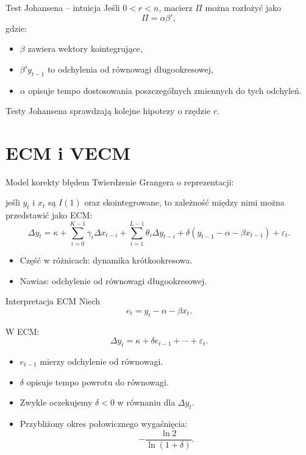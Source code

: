 \documentclass[11pt,aspectratio=169,xcolor=dvipsnames]{beamer}
\begin{document}
\begin{frame}{Test Johansena -- intuicja}
  Jeśli $0<r<n$, macierz $\Pi$ można rozłożyć jako
  \[
    \Pi = \alpha\beta',
  \]
  gdzie:
  \begin{itemize}
    \item $\beta$ zawiera wektory kointegrujące,
    \item $\beta'y_{t-1}$ to odchylenia od równowagi długookresowej,
    \item $\alpha$ opisuje tempo dostosowania poszczególnych zmiennych do tych odchyleń.
  \end{itemize}

  \vspace{0.3cm}
  Testy Johansena sprawdzają kolejne hipotezy o rzędzie $r$.
\end{frame}

\section{ECM i VECM}

\begin{frame}{Model korekty błędem}
  Twierdzenie Grangera o reprezentacji:

  jeśli $y_t$ i $x_t$ są $I(1)$ oraz skointegrowane, to zależność między nimi można przedstawić jako ECM:
  \[
    \Delta y_t
      = \kappa
      + \sum_{i=0}^{K-1}\gamma_i\Delta x_{t-i}
      + \sum_{i=1}^{L-1}\theta_i\Delta y_{t-i}
      + \delta (y_{t-1}-\alpha-\beta x_{t-1})
      + \varepsilon_t.
  \]

  \begin{itemize}
    \item Część w różnicach: dynamika krótkookresowa.
    \item Nawias: odchylenie od równowagi długookresowej.
  \end{itemize}
\end{frame}

\begin{frame}{Interpretacja ECM}
  Niech
  \[
    e_t = y_t - \alpha - \beta x_t.
  \]

  W ECM:
  \[
    \Delta y_t = \kappa + \delta e_{t-1} + \cdots + \varepsilon_t.
  \]

  \begin{itemize}
    \item $e_{t-1}$ mierzy odchylenie od równowagi.
    \item $\delta$ opisuje tempo powrotu do równowagi.
    \item Zwykle oczekujemy $\delta<0$ w równaniu dla $\Delta y_t$.
    \item Przybliżony okres połowicznego wygaśnięcia:
      \[
        -\frac{\ln 2}{\ln(1+\delta)}.
      \]
  \end{itemize}
\end{frame}
\end{document}
